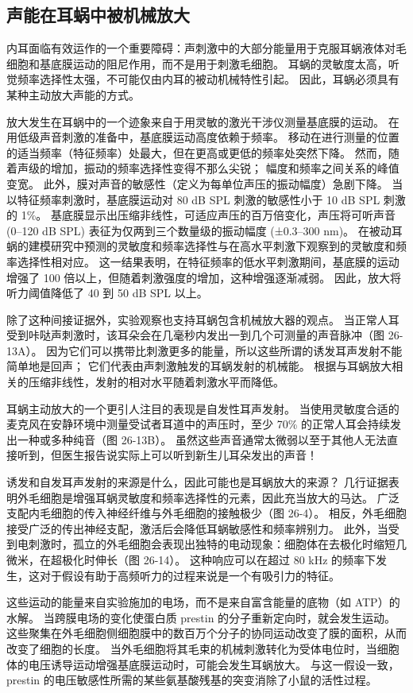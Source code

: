 \subsection{声能在耳蜗中被机械放大}
内耳面临有效运作的一个重要障碍：声刺激中的大部分能量用于克服耳蜗液体对毛细胞和基底膜运动的阻尼作用，而不是用于刺激毛细胞。 耳蜗的灵敏度太高，听觉频率选择性太强，不可能仅由内耳的被动机械特性引起。 因此，耳蜗必须具有某种主动放大声能的方式。

放大发生在耳蜗中的一个迹象来自于用灵敏的激光干涉仪测量基底膜的运动。 在用低级声音刺激的准备中，基底膜运动高度依赖于频率。 移动在进行测量的位置的适当频率（特征频率）处最大，但在更高或更低的频率处突然下降。 然而，随着声级的增加，振动的频率选择性变得不那么尖锐； 幅度和频率之间关系的峰值变宽。 此外，膜对声音的敏感性（定义为每单位声压的振动幅度）急剧下降。 当以特征频率刺激时，基底膜运动对 80 dB SPL 刺激的敏感性小于 10 dB SPL 刺激的 1\%。 基底膜显示出压缩非线性，可适应声压的百万倍变化，声压将可听声音 (0–120 dB SPL) 表征为仅两到三个数量级的振动幅度 (±0.3–300 nm)。 在被动耳蜗的建模研究中预测的灵敏度和频率选择性与在高水平刺激下观察到的灵敏度和频率选择性相对应。 这一结果表明，在特征频率的低水平刺激期间，基底膜的运动增强了 100 倍以上，但随着刺激强度的增加，这种增强逐渐减弱。 因此，放大将听力阈值降低了 40 到 50 dB SPL 以上。


除了这种间接证据外，实验观察也支持耳蜗包含机械放大器的观点。 当正常人耳受到咔哒声刺激时，该耳朵会在几毫秒内发出一到几个可测量的声音脉冲（图 26-13A）。 因为它们可以携带比刺激更多的能量，所以这些所谓的诱发耳声发射不能简单地是回声； 它们代表由声刺激触发的耳蜗发射的机械能。 根据与耳蜗放大相关的压缩非线性，发射的相对水平随着刺激水平而降低。

耳蜗主动放大的一个更引人注目的表现是自发性耳声发射。 当使用灵敏度合适的麦克风在安静环境中测量受试者耳道中的声压时，至少 70\% 的正常人耳会持续发出一种或多种纯音（图 26-13B）。 虽然这些声音通常太微弱以至于其他人无法直接听到，但医生报告说实际上可以听到新生儿耳朵发出的声音！

诱发和自发耳声发射的来源是什么，因此可能也是耳蜗放大的来源？ 几行证据表明外毛细胞是增强耳蜗灵敏度和频率选择性的元素，因此充当放大的马达。 广泛支配内毛细胞的传入神经纤维与外毛细胞的接触极少（图 26-4）。 相反，外毛细胞接受广泛的传出神经支配，激活后会降低耳蜗敏感性和频率辨别力。 此外，当受到电刺激时，孤立的外毛细胞会表现出独特的电动现象：细胞体在去极化时缩短几微米，在超极化时伸长（图 26-14）。 这种响应可以在超过 80 kHz 的频率下发生，这对于假设有助于高频听力的过程来说是一个有吸引力的特征。

这些运动的能量来自实验施加的电场，而不是来自富含能量的底物（如 ATP）的水解。 当跨膜电场的变化使蛋白质 prestin 的分子重新定向时，就会发生运动。 这些聚集在外毛细胞侧细胞膜中的数百万个分子的协同运动改变了膜的面积，从而改变了细胞的长度。 当外毛细胞将其毛束的机械刺激转化为受体电位时，当细胞体的电压诱导运动增强基底膜运动时，可能会发生耳蜗放大。 与这一假设一致，prestin 的电压敏感性所需的某些氨基酸残基的突变消除了小鼠的活性过程。

